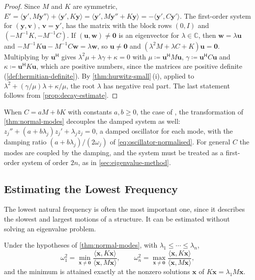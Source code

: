 \begin{proof}
Since $M$ and $K$ are symmetric, $E'=\langle\mathbf y',M\mathbf y''\rangle+\langle\mathbf y',K\mathbf y\rangle=\langle\mathbf y',M\mathbf y''+K\mathbf y\rangle=-\langle\mathbf y',C\mathbf y'\rangle$. The first-order system for $(\mathbf y,\mathbf v)$, $\mathbf v=\mathbf y'$, has the matrix with the block rows $(0,I)$ and $(-M^{-1}K,-M^{-1}C)$. If $(\mathbf u,\mathbf w)\ne\mathbf 0$ is an eigenvector for $\lambda\in\mathbb C$, then $\mathbf w=\lambda\mathbf u$ and $-M^{-1}K\mathbf u-M^{-1}C\mathbf w=\lambda\mathbf w$, so $\mathbf u\ne\mathbf 0$ and $(\lambda^2M+\lambda C+K)\mathbf u=\mathbf 0$. Multiplying by $\mathbf u^{\mathsf H}$ gives $\lambda^2\mu+\lambda\gamma+\kappa=0$ with $\mu\coloneqq\mathbf u^{\mathsf H}M\mathbf u$, $\gamma\coloneqq\mathbf u^{\mathsf H}C\mathbf u$ and $\kappa\coloneqq\mathbf u^{\mathsf H}K\mathbf u$, which are positive numbers, since the matrices are positive definite (\cref{def:hermitian-definite}). By \cref{thm:hurwitz-small}\,(i), applied to $\lambda^2+(\gamma/\mu)\lambda+\kappa/\mu$, the root $\lambda$ has negative real part. The last statement follows from \cref{prop:decay-estimate}.
\end{proof}

When $C=aM+bK$ with constants $a,b\ge0$, the case of , the transformation of \cref{thm:normal-modes} decouples the damped system as well: $z_j''+(a+b\lambda_j)z_j'+\lambda_jz_j=0$, a damped oscillator for each mode, with the damping ratio $(a+b\lambda_j)/(2\omega_j)$ of \eqref{eq:oscillator-normalised}. For general $C$ the modes are coupled by the damping, and the system must be treated as a first-order system of order $2n$, as in \cref{sec:eigenvalue-method}.

\subsection{Estimating the Lowest Frequency}

The lowest natural frequency is often the most important one, since it describes the slowest and largest motions of a structure. It can be estimated without solving an eigenvalue problem.

\begin{proposition}
\label{prop:rayleigh-frequency}
Under the hypotheses of \cref{thm:normal-modes}, with $\lambda_1\le\cdots\le\lambda_n$,
\[
\omega_1^2=\min_{\mathbf x\ne\mathbf 0}\frac{\langle\mathbf x,K\mathbf x\rangle}{\langle\mathbf x,M\mathbf x\rangle},\qquad\omega_n^2=\max_{\mathbf x\ne\mathbf 0}\frac{\langle\mathbf x,K\mathbf x\rangle}{\langle\mathbf x,M\mathbf x\rangle},
\]
and the minimum is attained exactly at the nonzero solutions $\mathbf x$ of $K\mathbf x=\lambda_1M\mathbf x$.
\end{proposition}


